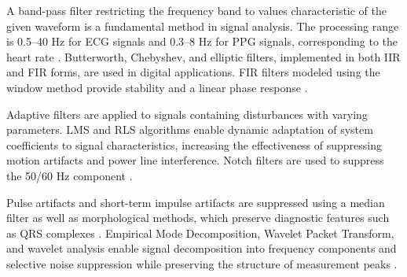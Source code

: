 \documentclass[journal]{IEEEtran}
\begin{document}
A band-pass filter restricting the frequency band to values characteristic of the given waveform is a fundamental method in signal analysis. The processing range is 0.5–40 Hz for ECG signals and 0.3–8 Hz for PPG signals, corresponding to the heart rate \cite{3}. Butterworth, Chebyshev, and elliptic filters, implemented in both IIR and FIR forms, are used in digital applications. FIR filters modeled using the window method provide stability and a linear phase response \cite{4}.

Adaptive filters are applied to signals containing disturbances with varying parameters. LMS and RLS algorithms enable dynamic adaptation of system coefficients to signal characteristics, increasing the effectiveness of suppressing motion artifacts and power line interference. Notch filters are used to suppress the 50/60 Hz component \cite{5}.

\newpage
Pulse artifacts and short-term impulse artifacts are suppressed using a median filter as well as morphological methods, which preserve diagnostic features such as QRS complexes \cite{6}. Empirical Mode Decomposition, Wavelet Packet Transform, and wavelet analysis enable signal decomposition into frequency components and selective noise suppression while preserving the structure of measurement peaks \cite{7}.
\end{document}

